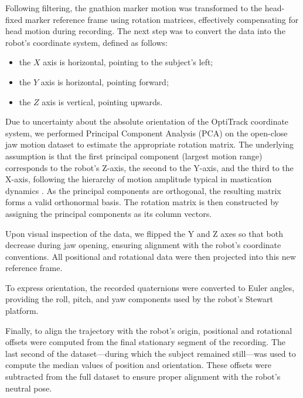 Following filtering, the gnathion marker motion was transformed to the head-fixed marker reference frame using rotation matrices, effectively compensating 
for head motion during recording. The next step was to convert the data into the robot's coordinate system, defined as follows:
\begin{itemize}[nosep]
    \item the $X$ axis is horizontal, pointing to the subject's left;
    \item the $Y$ axis is horizontal, pointing forward;
    \item the $Z$ axis is vertical, pointing upwards.
\end{itemize}
Due to uncertainty about the absolute orientation of the OptiTrack coordinate system, we performed Principal Component Analysis (PCA) on the open-close 
jaw motion dataset to estimate the appropriate rotation matrix. The underlying assumption is that the first principal component (largest motion range) 
corresponds to the robot's Z-axis, the second to the Y-axis, and the third to the X-axis, following the hierarchy of motion amplitude typical in mastication 
dynamics \cite{mouth_opening_mvt}. As the principal components are orthogonal, the resulting matrix forms a valid orthonormal basis. The rotation matrix is 
then constructed by assigning the principal components as its column vectors.

Upon visual inspection of the data, we flipped the Y and Z axes so that both decrease during jaw opening, ensuring alignment with the robot's coordinate 
conventions. All positional and rotational data were then projected into this new reference frame.

To express orientation, the recorded quaternions were converted to Euler angles, providing the roll, pitch, and yaw components used by the robot's 
Stewart platform.

Finally, to align the trajectory with the robot's origin, positional and rotational offsets were computed from the final stationary segment of the 
recording. The last second of the dataset—during which the subject remained still—was used to compute the median values of position and orientation. 
These offsets were subtracted from the full dataset to ensure proper alignment with the robot's neutral pose.




